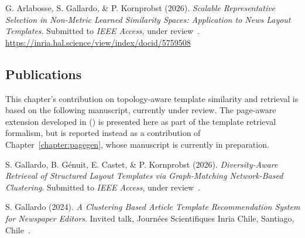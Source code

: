 \begin{callout}
G. Arlabosse, S. Gallardo, \& P. Kornprobst (2026). \emph{Scalable Representative Selection in Non-Metric Learned Similarity Spaces: Application to News Layout Templates}. Submitted to \emph{IEEE Access}, under review~. \url{https://inria.hal.science/view/index/docid/5759508}
\end{callout}

\subsection*{Publications}

This chapter's contribution on topology-aware template similarity and retrieval is based on the following manuscript, currently under review. The page-aware extension developed in  (\neuralmethod) is presented here as part of the template retrieval formalism, but is reported instead as a contribution of Chapter~\ref{chapter:pagegen}, whose manuscript is currently in preparation.


\begin{callout}
S. Gallardo, B. G\'enuit, E. Castet, \& P. Kornprobst (2026). \emph{Diversity-Aware Retrieval of Structured Layout Templates via Graph-Matching Network-Based Clustering}. Submitted to \emph{IEEE Access}, under review~.

S. Gallardo (2024). \emph{A Clustering Based Article Template Recommendation System for Newspaper Editors}. Invited talk, Journ\'ees Scientifiques Inria Chile, Santiago, Chile~.
\end{callout}


